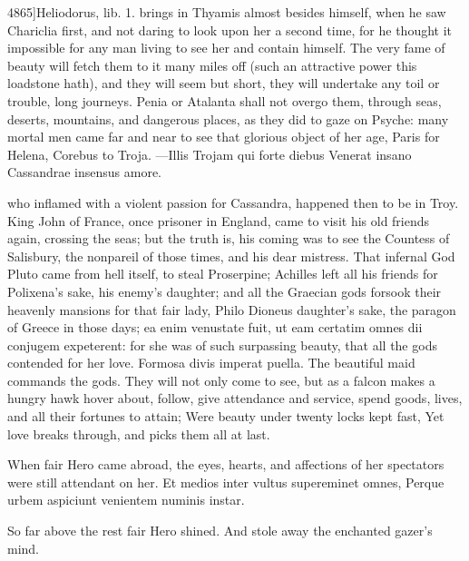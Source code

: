 4865]Heliodorus, lib. 1. brings in Thyamis almost besides himself, when
he saw Chariclia first, and not daring to look upon her a second time,
for he thought it impossible for any man living to see her and contain
himself. The very fame of beauty will fetch them to it many miles off
(such an attractive power this loadstone hath), and they will seem but
short, they will undertake any toil or trouble, long journeys.
Penia or Atalanta shall not overgo them, through seas, deserts,
mountains, and dangerous places, as they did to gaze on Psyche: many
mortal men came far and near to see that glorious object of her age,
Paris for Helena, Corebus to Troja.
---Illis Trojam qui forte diebus
Venerat insano Cassandrae insensus amore.

who inflamed with a violent passion for Cassandra, happened then to be
in Troy. King John of France, once prisoner in England, came to visit
his old friends again, crossing the seas; but the truth is, his coming
was to see the Countess of Salisbury, the nonpareil of those times, and
his dear mistress. That infernal God Pluto came from hell itself, to
steal Proserpine; Achilles left all his friends for Polixena's sake,
his enemy's daughter; and all the Graecian gods forsook their
heavenly mansions for that fair lady, Philo Dioneus daughter's sake,
the paragon of Greece in those days; ea enim venustate fuit, ut eam
certatim omnes dii conjugem expeterent: for she was of such surpassing
beauty, that all the gods contended for her love. Formosa divis
imperat puella. The beautiful maid commands the gods. They will not
only come to see, but as a falcon makes a hungry hawk hover about,
follow, give attendance and service, spend goods, lives, and all their
fortunes to attain;
Were beauty under twenty locks kept fast,
Yet love breaks through, and picks them all at last.

When fair Hero came abroad, the eyes, hearts, and affections of
her spectators were still attendant on her.
Et medios inter vultus supereminet omnes,
Perque urbem aspiciunt venientem numinis instar.

So far above the rest fair Hero shined.
And stole away the enchanted gazer's mind.

